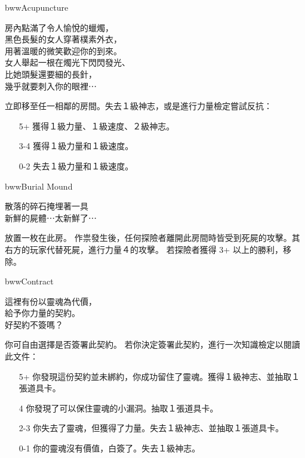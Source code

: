 %
\begin{EventCard}{bww}{Acupuncture}
  \begin{CardStory}
    房內點滿了令人愉悅的蠟燭，\\
    黑色長髮的女人穿著樸素外衣，\\
    用著溫暖的微笑歡迎你的到來。\\
    女人舉起一根在燭光下閃閃發光、\\
    比她頭髮還要細的長針，\\
    幾乎就要刺入你的眼裡⋯
  \end{CardStory}
  立即移至任一相鄰的房間。失去１級神志，或是進行力量檢定嘗試反抗：
  \begin{itemize}
    \item[5+] 獲得１級力量、１級速度、２級神志。
    \item[3-4] 獲得１級力量和１級速度。
    \item[0-2] 失去１級力量和１級速度。
  \end{itemize}
\end{EventCard}%
\linebreak[0]%
\begin{EventCard}{bww}{Burial Mound}
  \begin{CardStory}
    散落的碎石掩埋著一具\\
    新鮮的屍體⋯太新鮮了⋯
  \end{CardStory}
  放置一枚在此房。\smallbreak
  作祟發生後，任何探險者離開此房間時皆受到死屍的攻擊。其右方的玩家代替死屍，進行力量４的攻擊。\smallbreak
  若探險者獲得 3+ 以上的勝利，移除。\smallbreak
\end{EventCard}%
\linebreak[0]%
\begin{EventCard}{bww}{Contract}
  \begin{CardStory}
    這裡有份以靈魂為代價，\\
    給予你力量的契約。\\
    好契約不簽嗎？
  \end{CardStory}
  你可自由選擇是否簽署此契約。\smallbreak
  若你決定簽署此契約，進行一次知識檢定以閱讀此文件：
  \begin{itemize}
    \item[5+] 你發現這份契約並未綁約，你成功留住了靈魂。獲得１級神志、並抽取１張道具卡。
    \item[4] 你發現了可以保住靈魂的小漏洞。抽取１張道具卡。
    \item[2-3] 你失去了靈魂，但獲得了力量。失去１級神志、並抽取１張道具卡。
    \item[0-1] 你的靈魂沒有價值，白簽了。失去１級神志。
  \end{itemize}
\end{EventCard}%

